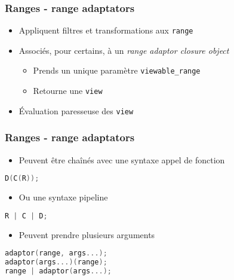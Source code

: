 \documentclass[C++.tex]{subfiles}
\begin{document}
\begin{frame}[fragile]
	\frametitle{Ranges - range adaptators}
	\begin{itemize}
		\item Appliquent filtres et transformations aux \lstinline|range|
		\item Associés, pour certains, à un \textit{range adaptor closure object}
		\begin{itemize}
			\item Prends un unique paramètre \lstinline|viewable_range|
			\item Retourne une \lstinline|view|
		\end{itemize}
		\item Évaluation paresseuse des \lstinline|view|
	\end{itemize}
\end{frame}

\begin{frame}[fragile]
	\frametitle{Ranges - range adaptators}
	\begin{itemize}
		\item Peuvent être chaînés avec une syntaxe \og appel de fonction\fg{}
	\end{itemize}

	\begin{lstlisting}[language=C++]
D(C(R));\end{lstlisting}

	\begin{itemize}
		\item Ou une syntaxe \og pipeline\fg{}
	\end{itemize}

	\begin{lstlisting}[language=C++]
R | C | D;\end{lstlisting}

	\begin{itemize}
		\item Peuvent prendre plusieurs arguments

	\end{itemize}

	\begin{lstlisting}[language=C++]
adaptor(range, args...);
adaptor(args...)(range);
range | adaptor(args...);\end{lstlisting}

\end{frame}
\end{document}
